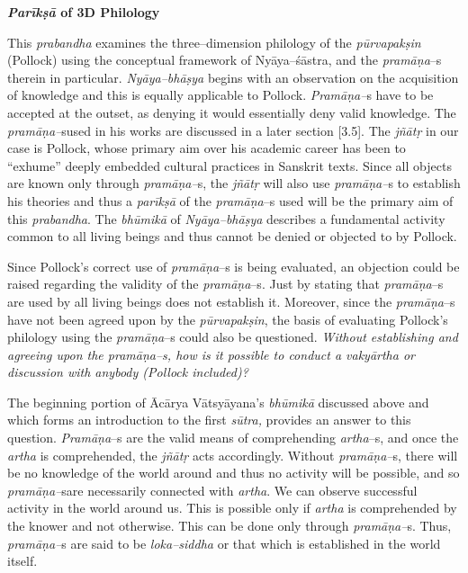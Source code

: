 \textbf{\textit{Parīkṣā} of 3D Philology}

This \textit{prabandha} examines the three–dimension philology of the \textit{pūrvapakṣin} (Pollock) using the conceptual framework of Nyāya–śāstra, and the \textit{pramāṇa}–s therein in particular. \textit{Nyāya–bhāṣya} begins with an observation on the acquisition of knowledge and this is equally applicable to Pollock. \textit{Pramāṇa–}s have to be accepted at the outset, as denying it would essentially deny valid knowledge. The \textit{pramāṇa–}s\break used in his works are discussed in a later section [3.5]. The \textit{jñātṛ} in our case is Pollock, whose primary aim over his academic career has been to “exhume” deeply embedded cultural practices in Sanskrit texts. Since all objects are known only through \textit{pramāṇa–}s, the \textit{jñātṛ} will also use \textit{pramāṇa–}s to establish his theories and thus a \textit{parīkṣā} of the \textit{pramāṇa}–s used will be the primary aim of this \textit{prabandha}. The \textit{bhūmikā} of \textit{Nyāya–bhāṣya} describes a fundamental activity common to all living beings and thus cannot be denied or objected to by Pollock.

Since Pollock’s correct use of \textit{pramāṇa}–s is being evaluated, an objection could be raised regarding the validity of the \textit{pramāṇa}–s. Just by stating that \textit{pramāṇa}–s are used by all living beings does not establish it. Moreover, since the \textit{pramāṇa}–s have not been agreed upon by the \textit{pūrvapakṣin}, the basis of evaluating Pollock’s philology using the \textit{pramāṇa}–s could also be questioned. \textit{Without establishing and agreeing upon the pramāṇa–s, how is it possible to conduct a vakyārtha or discussion with anybody (Pollock included)?}

The beginning portion of Ācārya Vātsyāyana’s \textit{bhūmikā} discussed above and which forms an introduction to the first \textit{sūtra,} provides an answer to this question. \textit{Pramāṇa}–s are the valid means of comprehending \textit{artha}–s, and once the \textit{artha} is comprehended, the \textit{jñātṛ} acts accordingly. Without \textit{pramāṇa–}s, there will be no knowledge of the world around and thus no activity will be possible, and so \textit{pramāṇa–}s\break are necessarily connected with \textit{artha}. We can observe successful activity in the world around us. This is possible only if \textit{artha} is comprehended by the knower and not otherwise. This can be done only through \textit{pramāṇa–}s. Thus, \textit{pramāṇa–}s are said to be \textit{loka–siddha} or that which is established in the world itself.

